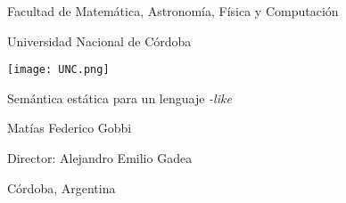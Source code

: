 \begin{titlepage}
    \begin{center}
    
    \vspace*{1.0cm}
    
    \huge
    Facultad de Matemática, Astronomía, Física y Computación
    
    \vspace{1.0cm}
    
    \Large
    Universidad Nacional de Córdoba
    
    \vspace{1.0cm}
    
    \texttt{[image: UNC.png]}
    
    \vspace{2.0cm}
    
    
    
    \Large
    Semántica estática para un lenguaje \textit{\Pascal{}-like}
    
    \vspace{2.0cm}
    
    \Large
    Matías Federico Gobbi
    
    \vspace{0.5cm}
    
    \large
    Director: Alejandro Emilio Gadea
    
    \vspace{2.0cm}
    
    \normalsize
    Córdoba, Argentina
    \hfill
    \the\year{}

    \end{center}
\end{titlepage}
